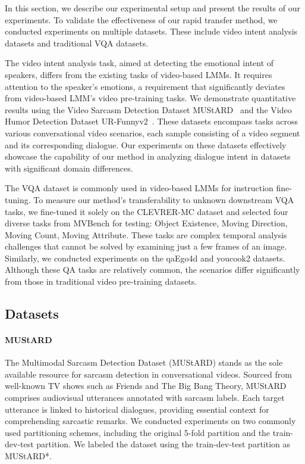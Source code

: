 In this section, we describe our experimental setup and present the results of our experiments. To validate the effectiveness of our rapid transfer method, we conducted experiments on multiple datasets. These include video intent analysis datasets and traditional VQA datasets. 


The video intent analysis task, aimed at detecting the emotional intent of speakers, differs from the existing tasks of video-based LMMs. It requires attention to the speaker's emotions, a requirement that significantly deviates from video-based LMM's video pre-training tasks. We demonstrate quantitative results using the Video Sarcasm Detection Dataset MUStARD~\cite{castro-etal-2019-towards} and the Video Humor Detection Dataset UR-Funnyv2~\cite{hasan2019ur}. These datasets encompass tasks across various conversational video scenarios, each sample consisting of a video segment and its corresponding dialogue. Our experiments on these datasets effectively showcase the capability of our method in analyzing dialogue intent in datasets with significant domain differences.

The VQA dataset is commonly used in video-based LMMs for instruction fine-tuning. To measure our method's transferability to unknown downstream VQA tasks, we fine-tuned it solely on the CLEVRER-MC\cite{yi2019clevrer} dataset and selected four diverse tasks from MVBench \cite{li2023mvbench} for testing: Object Existence, Moving Direction, Moving Count, Moving Attribute. These tasks are complex temporal analysis challenges that cannot be solved by examining just a few frames of an image. Similarly, we conducted experiments on the qaEgo4d\cite{barmann2022did} and youcook2\cite{zhou2018towards} datasets. Although these QA tasks are relatively common, the scenarios differ significantly from those in traditional video pre-training datasets. 



\subsection{Datasets}

 \paragraph{MUStARD\cite{castro-etal-2019-towards}} The Multimodal Sarcasm Detection Dataset (MUStARD) stands as the sole available resource for sarcasm detection in conversational videos. Sourced from well-known TV shows such as Friends and The Big Bang Theory, MUStARD comprises audiovisual utterances annotated with sarcasm labels. Each target utterance is linked to historical dialogues, providing essential context for comprehending sarcastic remarks. We conducted experiments on two commonly used partitioning schemes, including the original 5-fold partition and the train-dev-test partition. We labeled the dataset using the train-dev-test partition as MUStARD*. 

